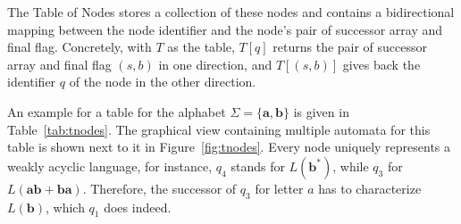 \par

The Table of Nodes stores a collection of these nodes and contains a bidirectional mapping between the node identifier and the node's pair of successor array and final flag. Concretely, with $T$ as the table, $T[q]$ returns the pair of successor array and final flag $(s,b)$ in one direction, and $T[(s,b)]$ gives back the identifier $q$ of the node in the other direction. 

\par

An example for a table for the alphabet $\Sigma = \{ \bm{a},\bm{b}\}$ is given in Table~\ref{tab:tnodes}. The graphical view containing multiple automata for this table is shown next to it in Figure~\ref{fig:tnodes}. Every node uniquely represents a weakly acyclic language, for instance, $q_{4}$ stands for $L(\bm{b^{*}})$, while $q_{3}$ for $L(\bm{ab+ba})$. Therefore, the successor of $q_{3}$ for letter $a$ has to characterize $L(\bm{b})$, which $q_{1}$ does indeed.

